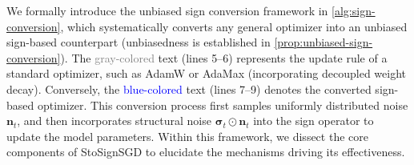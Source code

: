 \documentclass{article}
\def \n {\mathbf{n}}
\def \bsigma {\bm{\sigma}}
\begin{document}
We formally introduce the unbiased sign conversion framework in \cref{alg:sign-conversion}, which systematically converts any general optimizer into an unbiased sign-based counterpart (unbiasedness is established in \cref{prop:unbiased-sign-conversion}). The \textcolor{gray}{gray-colored} text (lines 5--6) represents the update rule of a standard optimizer, such as AdamW or AdaMax (incorporating decoupled weight decay). Conversely, the \textcolor{blue}{blue-colored} text (lines 7--9) denotes the converted sign-based optimizer. This conversion process first samples uniformly distributed noise $\n_t$, and then incorporates structural noise $\bsigma_t\odot\n_t$ into the sign operator to update the model parameters. Within this framework, we dissect the core components of StoSignSGD to elucidate the mechanisms driving its effectiveness.
\end{document}
